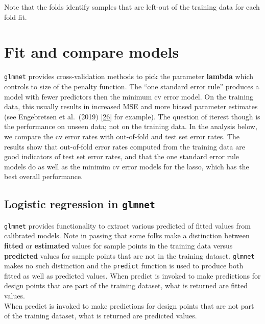 \documentclass[
]{book}
\begin{document}
Note that the folds identify samples that are left-out of the training
data for each fold fit.

\hypertarget{fit-and-compare-models}{%
\section{Fit and compare models}\label{fit-and-compare-models}}

\texttt{glmnet} provides cross-validation methods to pick the parameter \textbf{lambda} which
controls to size of the penalty function. The ``one standard error rule''
produces a model with fewer predictors then the minimum cv error model.
On the training data, this usually results in increased MSE and more
biased parameter estimates
(see Engebretsen et al.~(2019) {[}\protect\hyperlink{ref-Engebretsen:2019aa}{26}{]} for example).
The question of iterest though is the performance on unseen data; not on the training data.
In the analysis below, we compare the cv error rates with out-of-fold and
test set error rates. The results show that out-of-fold error rates computed from
the training data are good indicators of test set error rates, and that
the one standard error rule models do as well as the minimim cv error models
for the lasso, which has the best overall performance.

\hypertarget{logistic-regression-in-glmnet}{%
\subsection{\texorpdfstring{Logistic regression in \texttt{glmnet}}{Logistic regression in glmnet}}\label{logistic-regression-in-glmnet}}

\texttt{glmnet} provides functionality to extract various predicted of fitted values
from calibrated models. Note in passing that some folks make a distinction between
\textbf{fitted} or \textbf{estimated} values for sample points in the training data
versus \textbf{predicted} values for sample points that
are not in the training dataset. \texttt{glmnet} makes no such distinction and the
\texttt{predict} function is used to produce both fitted as well as predicted values.
When predict is invoked to make predictions for design points that are part
of the training dataset, what is returned are fitted values.\\
When predict is invoked to make predictions for design points that are not part
of the training dataset, what is returned are predicted values.
\end{document}
